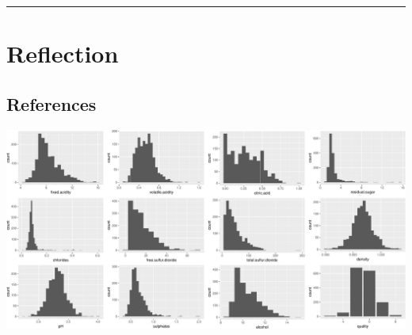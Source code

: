 \documentclass[]{article}
\begin{document}
\begin{center}\rule{0.5\linewidth}{\linethickness}\end{center}

\section{Reflection}\label{reflection}

\subsection{References}\label{references}

\includegraphics{Figs/Univariate_Plots_1-1.pdf}


\end{document}
